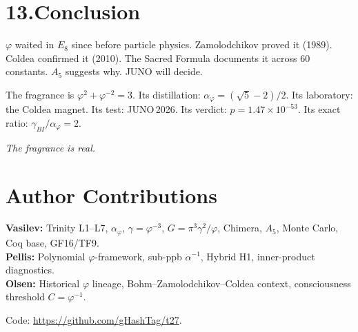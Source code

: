 \documentclass[12pt,a4paper]{article}
\newcommand{\ph}{\varphi}
\newcommand{\aph}{\alpha_{\varphi}}
\newcommand{\gam}{\gamma_{\!BI}}
\begin{document}
\section*{13.\quad Conclusion}

$\ph$ waited in $E_8$ since before particle physics.
Zamolodchikov proved it (1989). Coldea confirmed it (2010).
The Sacred Formula documents it across 60 constants.
$A_5$ suggests why. JUNO will decide.

\medskip\noindent
The fragrance is $\ph^2+\ph^{-2}=3$.
Its distillation: $\aph = (\sqrt{5}-2)/2$.
Its laboratory: the Coldea magnet.
Its test: JUNO\,2026.
Its verdict: $p=1.47\times10^{-53}$.
Its exact ratio: $\gam/\aph = 2$.

\medskip
\textit{The fragrance is real.}

\section*{Author Contributions}

\textbf{Vasilev:} Trinity L1--L7, $\aph$, $\gamma=\ph^{-3}$, $G=\pi^3\gamma^2/\ph$,
  Chimera, $A_5$, Monte Carlo, Coq base, GF16/TF9.\\
\textbf{Pellis:} Polynomial $\ph$-framework, sub-ppb $\alpha^{-1}$, Hybrid H1,
  inner-product diagnostics.\\
\textbf{Olsen:} Historical $\ph$ lineage, Bohm--Zamolodchikov--Coldea context,
  consciousness threshold $C=\ph^{-1}$.

\medskip\noindent
Code: \url{https://github.com/gHashTag/t27}.
\end{document}

